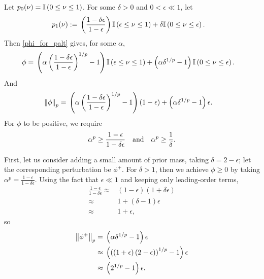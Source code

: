 \begin{ex}
Let $p_{0}(\nu) = \mathbb{I}\left(0 \le \nu \le 1\right)$.  For some $\delta > 0$ and $0 <
\epsilon \ll 1$, let
%
\begin{align*}
%
\palt(\nu) :={}&
    \left(\frac{1-\delta \epsilon}{1 - \epsilon} \right)
        \ind{\epsilon \le \nu \le 1} +
    \delta \ind{0 \le \nu \le \epsilon}.
%
\end{align*}
%
Then \eqref{phi_for_palt} gives, for some $\alpha$,
%
\begin{align*}
%
\phi ={}&
    \left( \alpha\left(\frac{1-\delta \epsilon}{1-\epsilon} \right)^{1/p}
        - 1
    \right)
        \ind{\epsilon \le \nu \le 1} +
    \left(\alpha \delta^{1/p} - 1 \right) \ind{0 \le \nu \le \epsilon}.
%
%
\end{align*}
%
And
%
\begin{align*}
%
\norm{\phi}_p ={}&
    \left( \alpha\left(\frac{1-\delta \epsilon}{1-\epsilon} \right)^{1/p} - 1
    \right) (1- \epsilon) +
    \left(\alpha \delta^{1/p} - 1 \right) \epsilon.
%
\end{align*}
%
For $\phi$ to be positive, we require
%
\begin{align*}
%
\alpha^p \ge \frac{1 - \epsilon}{1 - \delta \epsilon}
    \mathtxt{and}
\alpha^p \ge \frac{1}{\delta}.
%
\end{align*}

First, let us consider adding a small amount of prior mass, taking $\delta = 2 -
\epsilon$; let the corresponding perturbation be $\phi^+$.  For $\delta > 1$,
then we achieve $\phi \ge 0$ by taking $\alpha^p = \frac{1 - \epsilon}{1 -
\delta \epsilon}$.  Using the fact that $\epsilon \ll 1$ and keeping only
leading-order terms,
%
\begin{align*}
%
\frac{1-\epsilon}{1 - \delta \epsilon} \approx{}&
    (1- \epsilon)(1 + \delta \epsilon)
\\\approx{}& 1 + (\delta - 1) \epsilon
\\\approx{}& 1 + \epsilon,
%
\end{align*}
%
so
%
\begin{align*}
%
\norm{\phi^+}_p  ={}&
    \left(\alpha \delta^{1/p} - 1 \right) \epsilon
\\\approx{}&
    \left(
        \left( \left(1 + \epsilon\right) \left(2 - \epsilon \right)\right)^{1/p}
        - 1 \right) \epsilon
\\\approx{}&
%
\left( 2^{1/p} - 1 \right) \epsilon.
%
\end{align*}
%


\end{ex}
